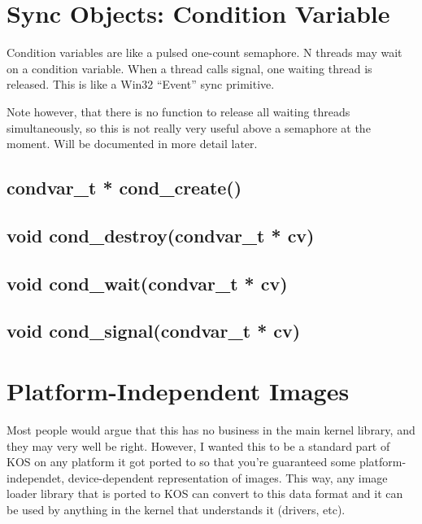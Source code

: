 \documentclass[english]{report}
\begin{document}

\section{Sync Objects: Condition Variable}

Condition variables are like a pulsed one-count semaphore. N threads
may wait on a condition variable. When a thread calls signal, one
waiting thread is released. This is like a Win32 ``Event'' sync
primitive.

Note however, that there is no function to release all waiting threads
simultaneously, so this is not really very useful above a semaphore
at the moment. Will be documented in more detail later.


\subsection{condvar\_t * cond\_create()}


\subsection{void cond\_destroy(condvar\_t * cv)}


\subsection{void cond\_wait(condvar\_t * cv)}


\subsection{void cond\_signal(condvar\_t * cv)}


\section{Platform-Independent Images}

Most people would argue that this has no business in the main kernel
library, and they may very well be right. However, I wanted this to
be a standard part of KOS on any platform it got ported to so that
you're guaranteed some platform-independet, device-dependent representation
of images. This way, any image loader library that is ported to KOS
can convert to this data format and it can be used by anything in
the kernel that understands it (drivers, etc).
\end{document}
